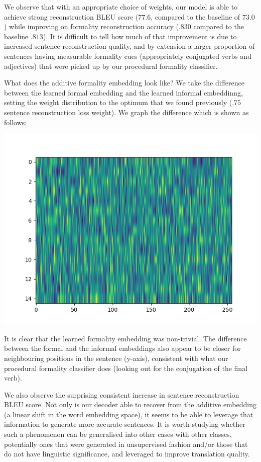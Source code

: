 \documentclass[11pt]{article}
\begin{document}
We observe that with an appropriate choice of weights, our model is able to achieve strong reconstruction BLEU score ($77.6$, compared to the baseline of $73.0$) while improving on formality reconstruction accuracy ($.830$ compared to the baseline $.813$). It is difficult to tell how much of that improvement is due to increased sentence reconstruction quality, and by extension a larger proportion of sentences having measurable formality cues (appropriately conjugated verbs and adjectives) that were picked up by our procedural formality classifier.

What does the additive formality embedding look like? We take the difference between the learned formal embedding and the learned informal embeddinng, setting the weight distribution to the optimum that we found previously ($.75$ sentence reconstruction loss weight). We graph the difference which is shown as follows:

\includegraphics{formality_embedding.png}

It is clear that the learned formality embedding was non-trivial. The difference between the formal and the informal embeddings also appear to be closer for neighbouring positions in the sentence (y-axis), consistent with what our procedural formality classifier does (looking out for the conjugation of the final verb).

We also observe the surprising consistent increase in sentence reconstruction BLEU score. Not only is our decoder able to recover from the additive embedding (a linear shift in the word embedding space), it seems to be able to leverage that information to generate more accurate sentences. It is worth studying whether such a phenomenon can be generalised into other cases with other classes, potentially ones that were generated in unsupervised fashion and/or those that do not have linguistic significance, and leveraged to improve translation quality.
\end{document}
